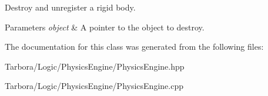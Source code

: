 Destroy and unregister a rigid body. 


\begin{DoxyParams}{Parameters}
{\em object} & A pointer to the object to destroy. \\
\hline
\end{DoxyParams}


The documentation for this class was generated from the following files\+:\begin{DoxyCompactItemize}
\item 
Tarbora/\+Logic/\+Physics\+Engine/Physics\+Engine.\+hpp\item 
Tarbora/\+Logic/\+Physics\+Engine/Physics\+Engine.\+cpp\end{DoxyCompactItemize}
